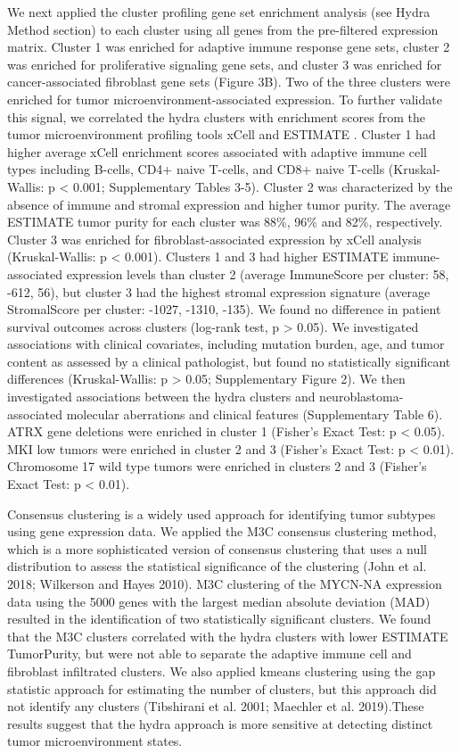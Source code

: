\documentclass[10pt,letterpaper]{article}
\begin{document}
We next applied the cluster profiling gene set enrichment analysis (see Hydra Method section) to each cluster using all genes from the pre-filtered expression matrix. Cluster 1 was enriched for adaptive immune response gene sets, cluster 2 was enriched for proliferative signaling gene sets, and cluster 3 was enriched for cancer-associated fibroblast gene sets (Figure 3B). Two of the three clusters were enriched for tumor microenvironment-associated expression. To further validate this signal, we correlated the hydra clusters with enrichment scores from the tumor microenvironment profiling tools xCell \cite{aranXCellDigitallyPortraying2017} and ESTIMATE \cite{yoshiharaInferringTumourPurity2013a}. Cluster 1 had higher average xCell enrichment scores associated with adaptive immune cell types including B-cells, CD4+ naive T-cells, and CD8+ naive T-cells (Kruskal-Wallis: p < 0.001; Supplementary Tables 3-5). Cluster 2 was characterized by the absence of immune and stromal expression and higher tumor purity. The average ESTIMATE tumor purity for each cluster was 88\%, 96\% and 82\%, respectively. Cluster 3 was enriched for fibroblast-associated expression by xCell analysis (Kruskal-Wallis: p < 0.001). Clusters 1 and 3 had higher ESTIMATE immune-associated expression levels than cluster 2 (average ImmuneScore per cluster: 58, -612, 56), but cluster 3 had the highest stromal expression signature (average StromalScore per cluster: -1027, -1310, -135). We found no difference in patient survival outcomes across clusters (log-rank test, p > 0.05). We investigated associations with clinical covariates, including mutation burden, age, and tumor content as assessed by a clinical pathologist, but found no statistically significant differences (Kruskal-Wallis: p > 0.05; Supplementary Figure 2). We then investigated associations between the hydra clusters and neuroblastoma-associated molecular aberrations and clinical features (Supplementary Table 6). ATRX gene deletions were enriched in cluster 1 (Fisher’s Exact Test: p < 0.05). MKI low tumors were enriched in cluster 2 and 3 (Fisher’s Exact Test: p < 0.01). Chromosome 17 wild type tumors were enriched in clusters 2 and 3 (Fisher’s Exact Test: p < 0.01).

Consensus clustering is a widely used approach for identifying tumor subtypes using gene expression data. We applied the M3C consensus clustering method, which is a more sophisticated version of consensus clustering that uses a null distribution to assess the statistical significance of the clustering (John et al. 2018; Wilkerson and Hayes 2010). M3C clustering of the MYCN-NA expression data using the 5000 genes with the largest median absolute deviation (MAD) resulted in the identification of two statistically significant clusters. We found that the M3C clusters correlated with the hydra clusters with lower ESTIMATE TumorPurity, but were not able to separate the adaptive immune cell and fibroblast infiltrated clusters. We also applied kmeans clustering using the gap statistic approach for estimating the number of clusters, but this approach did not identify any clusters (Tibshirani et al. 2001; Maechler et al. 2019).These results suggest that the hydra approach is more sensitive at detecting distinct tumor microenvironment states.
\end{document}
